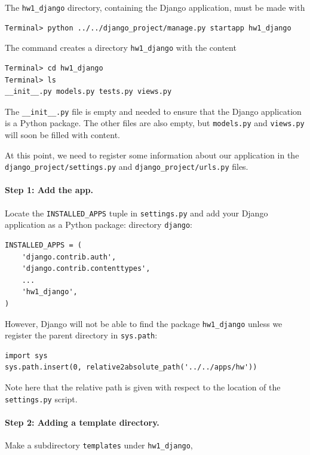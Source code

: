 \documentclass[%
oneside,                 %
final,                   %
10pt]{article}
\begin{document}
The \Verb!hw1_django! directory, containing the Django application, must be
made with
\begin{Verbatim}[numbers=none,fontsize=\fontsize{9pt}{9pt},baselinestretch=0.85]
Terminal> python ../../django_project/manage.py startapp hw1_django
\end{Verbatim}
The command creates a directory \Verb!hw1_django! with the content

\begin{Verbatim}[numbers=none,fontsize=\fontsize{9pt}{9pt},baselinestretch=0.85]
Terminal> cd hw1_django
Terminal> ls
__init__.py models.py tests.py views.py
\end{Verbatim}
The \Verb!__init__.py! file is empty and needed to ensure that the
Django application is a Python package. The other files are also
empty, but \Verb!models.py! and \Verb!views.py! will soon be filled with content.

At this point,
we need to register some information about our application in the
\Verb!django_project/settings.py! and \Verb!django_project/urls.py! files.

\paragraph{Step 1: Add the app.}
Locate the \Verb!INSTALLED_APPS!
tuple in \Verb!settings.py! and add your Django application as a Python package:
directory \Verb!django!:

\begin{Verbatim}[numbers=none,fontsize=\fontsize{9pt}{9pt},baselinestretch=0.85]
INSTALLED_APPS = (
    'django.contrib.auth',
    'django.contrib.contenttypes',
    ...
    'hw1_django',
)
\end{Verbatim}
However, Django will not be able to find the package \Verb!hw1_django!
unless we register the parent directory in \Verb!sys.path!:

\begin{Verbatim}[numbers=none,fontsize=\fontsize{9pt}{9pt},baselinestretch=0.85]
import sys
sys.path.insert(0, relative2absolute_path('../../apps/hw'))
\end{Verbatim}
Note here that the relative path is given with respect to the
location of the \Verb!settings.py! script.

\paragraph{Step 2: Adding a template directory.}
Make a subdirectory \Verb!templates! under \Verb!hw1_django!,
\end{document}
